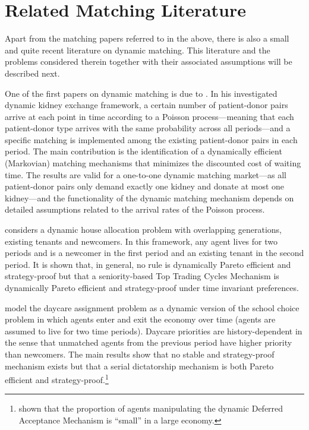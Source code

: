 \documentclass[12pt,fleqn]{article}
\begin{document}
\section{Related Matching Literature}\label{SEC:literature}
Apart from the matching papers referred to in the above, there is also a small and quite recent literature on dynamic matching. This literature and the problems considered therein together with their associated assumptions will be described next.

One of the first papers on dynamic matching is due to \citet{bib:Unver}. In his investigated dynamic kidney exchange framework, a certain number of patient-donor pairs arrive at each point in time according to a Poisson process---meaning that each patient-donor type arrives with the same probability across all periods---and a specific matching is implemented among the existing patient-donor pairs in each period. The main contribution is the identification of a dynamically efficient (Markovian) matching mechanisms that minimizes the discounted cost of waiting time. The results are valid for a one-to-one dynamic matching market---as all patient-donor pairs only demand exactly one kidney and donate at most one kidney---and the functionality of the dynamic matching mechanism depends on detailed assumptions related to the arrival rates of the Poisson process.

\citet{bib:Kurino} considers a dynamic house allocation problem with overlapping generations, existing tenants and newcomers. In this framework, any agent lives for two periods and is a newcomer in the first period and an existing tenant in the second period. It is shown that, in general, no rule is dynamically Pareto efficient and strategy-proof but that a seniority-based Top Trading Cycles Mechanism is dynamically Pareto efficient and strategy-proof under time invariant preferences.

\citet{bib:KennesEtAl2014} model the daycare assignment problem as a dynamic version of the school choice problem in which agents enter and exit the economy over time (agents are assumed to live for two time periods). Daycare priorities are history-dependent in the sense that unmatched agents from the previous period have higher priority than newcomers. The main results show that no stable and strategy-proof mechanism exists but that a serial dictatorship mechanism is both Pareto efficient and strategy-proof.\footnote{\citet{bib:KennesEtAl2015} shown that the proportion of agents manipulating the dynamic Deferred Acceptance Mechanism is ``small'' in a large economy.}
\end{document}
